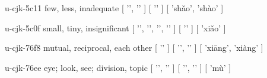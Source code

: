 \begin{multicols}{2}
\lettrine[lines=3]{\cjkgGlue{}}{}\begin{minipage}{0.8\linewidth} u-cjk-5c11  few, less, inadequate  [ '\cjkgGlue{}', '\cjkgGlue{}' ]  [ '\cjkgGlue{}' ]  [ 'shǎo', 'shào' ] \end{minipage}

\lettrine[lines=3]{\cjkgGlue{}}{}\begin{minipage}{0.8\linewidth} u-cjk-5c0f  small, tiny, insignificant  [ '\cjkgGlue{}', '\cjkgGlue{}', '\cjkgGlue{}', '\cjkgGlue{}' ]  [ '\cjkgGlue{}' ]  [ 'xiǎo' ] \end{minipage}

\lettrine[lines=3]{\cjkgGlue{}}{}\begin{minipage}{0.8\linewidth} u-cjk-76f8  mutual, reciprocal, each other  [ '\cjkgGlue{}' ]  [ '\cjkgGlue{}', '\cjkgGlue{}' ]  [ 'xiāng', 'xiàng' ] \end{minipage}

\lettrine[lines=3]{\cjkgGlue{}}{}\begin{minipage}{0.8\linewidth} u-cjk-76ee  eye; look, see; division, topic  [ '\cjkgGlue{}', '\cjkgGlue{}' ]  [ '\cjkgGlue{}', '\cjkgGlue{}' ]  [ 'mù' ] \end{minipage}


\end{multicols}

